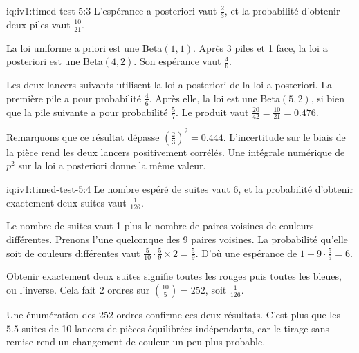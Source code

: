 \begin{solution}{iq:iv1:timed-test-5:3}
L'espérance a posteriori vaut $\frac23$, et la probabilité d'obtenir deux piles vaut $\frac{10}{21}$.

La loi uniforme a priori est une Beta$(1, 1)$. Après 3 piles et 1 face, la loi a posteriori est une Beta$(4, 2)$. Son espérance vaut $\frac46$.

Les deux lancers suivants utilisent la loi a posteriori de la loi a posteriori. La première pile a pour probabilité $\frac46$. Après elle, la loi est une Beta$(5, 2)$, si bien que la pile suivante a pour probabilité $\frac57$. Le produit vaut $\frac{20}{42} = \frac{10}{21} = 0.476$.

Remarquons que ce résultat dépasse $(\frac23)^2 = 0.444$. L'incertitude sur le biais de la pièce rend les deux lancers positivement corrélés. Une intégrale numérique de $p^2$ sur la loi a posteriori donne la même valeur.

\end{solution}

\begin{solution}{iq:iv1:timed-test-5:4}
Le nombre espéré de suites vaut 6, et la probabilité d'obtenir exactement deux suites vaut $\frac{1}{126}$.

Le nombre de suites vaut 1 plus le nombre de paires voisines de couleurs différentes. Prenons l'une quelconque des 9 paires voisines. La probabilité qu'elle soit de couleurs différentes vaut $\frac{5}{10}\cdot\frac{5}{9} \times 2 = \frac59$. D'où une espérance de $1 + 9 \cdot \frac59 = 6$.

Obtenir exactement deux suites signifie toutes les rouges puis toutes les bleues, ou l'inverse. Cela fait 2 ordres sur $\binom{10}{5} = 252$, soit $\frac{1}{126}$.

Une énumération des 252 ordres confirme ces deux résultats. C'est plus que les $5.5$ suites de 10 lancers de pièces équilibrées indépendants, car le tirage sans remise rend un changement de couleur un peu plus probable.

\end{solution}

